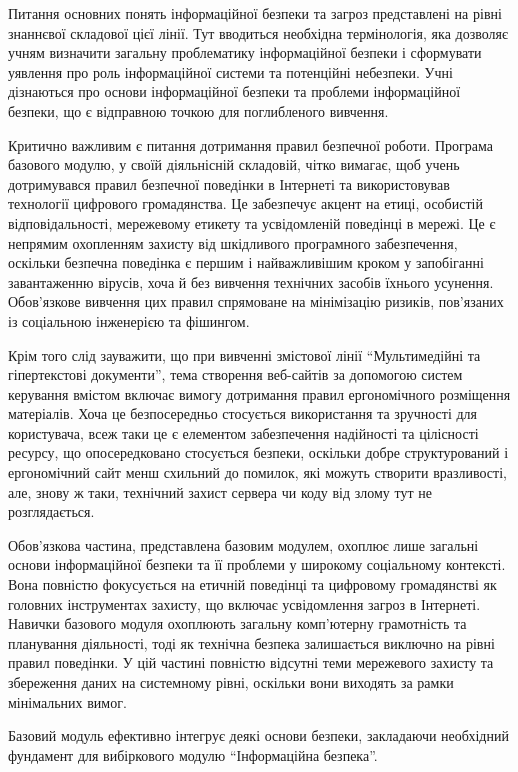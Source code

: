 Питання основних понять інформаційної безпеки та загроз представлені на рівні знаннєвої складової цієї лінії. Тут вводиться необхідна термінологія, яка дозволяє учням визначити загальну проблематику інформаційної безпеки і сформувати уявлення про роль інформаційної системи та потенційні небезпеки. Учні дізнаються про основи інформаційної безпеки та проблеми інформаційної безпеки, що є відправною точкою для поглибленого вивчення.

Критично важливим є питання дотримання правил безпечної роботи. Програма базового модулю, у своїй діяльнісній складовій, чітко вимагає, щоб учень дотримувався правил безпечної поведінки в Інтернеті та використовував технології цифрового громадянства. Це забезпечує акцент на етиці, особистій відповідальності, мережевому етикету та усвідомленій поведінці в мережі. Це є непрямим охопленням захисту від шкідливого програмного забезпечення, оскільки безпечна поведінка є першим і найважливішим кроком у запобіганні завантаженню вірусів, хоча й без вивчення технічних засобів їхнього усунення. Обов'язкове вивчення цих правил спрямоване на мінімізацію ризиків, пов'язаних із соціальною інженерією та фішингом.

Крім того слід зауважити, що при вивченні змістової лінії ``Мультимедійні та гіпертекстові документи'', тема створення веб-сайтів за допомогою систем керування вмістом включає вимогу дотримання правил ергономічного розміщення матеріалів. Хоча це безпосередньо стосується використання та зручності для користувача, всеж таки це є елементом забезпечення надійності та цілісності ресурсу, що опосередковано стосується безпеки, оскільки добре структурований і ергономічний сайт менш схильний до помилок, які можуть створити вразливості, але, знову ж таки, технічний захист сервера чи коду від злому тут не розглядається.

Обов'язкова частина, представлена базовим модулем, охоплює лише загальні основи інформаційної безпеки та її проблеми у широкому соціальному контексті. Вона повністю фокусується на етичній поведінці та цифровому громадянстві як головних інструментах захисту, що включає усвідомлення загроз в Інтернеті. Навички базового модуля охоплюють загальну комп'ютерну грамотність та планування діяльності, тоді як технічна безпека залишається виключно на рівні правил поведінки. У цій частині повністю відсутні теми мережевого захисту та збереження даних на системному рівні, оскільки вони виходять за рамки мінімальних вимог.

Базовий модуль ефективно інтегрує деякі основи безпеки, закладаючи необхідний фундамент для вибіркового модулю ``Інформаційна безпека''.


